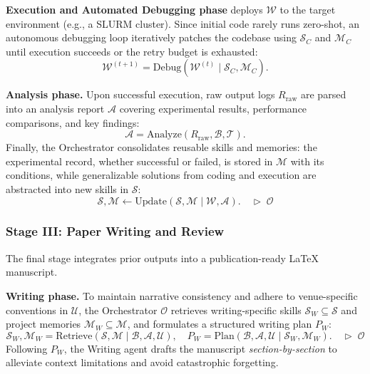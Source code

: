 \documentclass{opendatalab}
\begin{document}
\noindent\textbf{Execution and Automated Debugging phase} deploys $\mathcal{W}$ to the target environment (e.g., a SLURM cluster). Since initial code rarely runs zero-shot, an autonomous debugging loop iteratively patches the codebase using $\mathcal{S}_C$ and $\mathcal{M}_C$ until execution succeeds or the retry budget is exhausted:
\begin{equation}
    \mathcal{W}^{(t+1)} = \text{Debug}(\mathcal{W}^{(t)} \mid \mathcal{S}_C, \mathcal{M}_C).
\end{equation}

\noindent\textbf{Analysis phase.}
Upon successful execution, raw output logs $R_{\text{raw}}$ are parsed into an analysis report $\mathcal{A}$ covering experimental results, performance comparisons, and key findings:
\begin{equation}
    \mathcal{A} = \text{Analyze}(R_{\text{raw}}, \mathcal{B}, \mathcal{T}).
\end{equation}
Finally, the Orchestrator consolidates reusable skills and memories: the experimental record, whether successful or failed, is stored in $\mathcal{M}$ with its conditions, while generalizable solutions from coding and execution are abstracted into new skills in $\mathcal{S}$:
\begin{equation}
    \mathcal{S}, \mathcal{M} \leftarrow \text{Update}(\mathcal{S}, \mathcal{M} \mid \mathcal{W}, \mathcal{A}). \quad \triangleright\;\mathcal{O}
\end{equation}

\subsubsection{Stage III: Paper Writing and Review}

The final stage integrates prior outputs into a publication-ready LaTeX manuscript.

\noindent\textbf{Writing phase.}
To maintain narrative consistency and adhere to venue-specific conventions in $\mathcal{U}$, the Orchestrator $\mathcal{O}$ retrieves writing-specific skills $\mathcal{S}_W \subseteq \mathcal{S}$ and project memories $\mathcal{M}_W \subseteq \mathcal{M}$, and formulates a structured writing plan $P_W$:
\begin{equation}
    \mathcal{S}_W, \mathcal{M}_W = \text{Retrieve}(\mathcal{S}, \mathcal{M} \mid \mathcal{B}, \mathcal{A}, \mathcal{U}), \quad P_W = \text{Plan}(\mathcal{B}, \mathcal{A}, \mathcal{U} \mid \mathcal{S}_W, \mathcal{M}_W). \quad \triangleright\;\mathcal{O}
\end{equation}
Following $P_W$, the Writing agent drafts the manuscript \textit{section-by-section} to alleviate context limitations and avoid catastrophic forgetting. 
\end{document}
